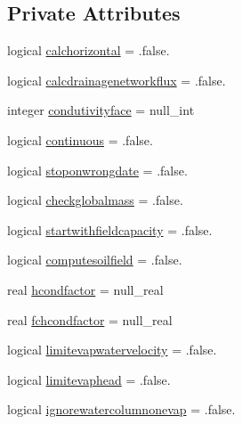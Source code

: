 \subsection*{Private Attributes}
\begin{DoxyCompactItemize}
\item 
logical \mbox{\hyperlink{structmoduleporousmedia_1_1t__soiloptions_aa0343da5c69229092aef8a6022fecd16}{calchorizontal}} = .false.
\item 
logical \mbox{\hyperlink{structmoduleporousmedia_1_1t__soiloptions_ab3c2ac806db1d13354ba04cb2abe049f}{calcdrainagenetworkflux}} = .false.
\item 
integer \mbox{\hyperlink{structmoduleporousmedia_1_1t__soiloptions_ab8d4991a4f4a66f29e309c6317639449}{condutivityface}} = null\+\_\+int
\item 
logical \mbox{\hyperlink{structmoduleporousmedia_1_1t__soiloptions_a7b56e8c8ae667711e0daf3c30b591d27}{continuous}} = .false.
\item 
logical \mbox{\hyperlink{structmoduleporousmedia_1_1t__soiloptions_a6dc4e877999dca7c798b42863714a2ee}{stoponwrongdate}} = .false.
\item 
logical \mbox{\hyperlink{structmoduleporousmedia_1_1t__soiloptions_ae86e4c7b2a514c6719dbc57762595a21}{checkglobalmass}} = .false.
\item 
logical \mbox{\hyperlink{structmoduleporousmedia_1_1t__soiloptions_a9871f788433b21664f0931d48e2155ea}{startwithfieldcapacity}} = .false.
\item 
logical \mbox{\hyperlink{structmoduleporousmedia_1_1t__soiloptions_ac13e34d272292b471e1415409523fc28}{computesoilfield}} = .false.
\item 
real \mbox{\hyperlink{structmoduleporousmedia_1_1t__soiloptions_a6660bb447a7f61d3d680fe48b5030d85}{hcondfactor}} = null\+\_\+real
\item 
real \mbox{\hyperlink{structmoduleporousmedia_1_1t__soiloptions_a7580cdc43976cf6906493f95f867d9ba}{fchcondfactor}} = null\+\_\+real
\item 
logical \mbox{\hyperlink{structmoduleporousmedia_1_1t__soiloptions_ad3f28160c4b73c3dece26376b526c34f}{limitevapwatervelocity}} = .false.
\item 
logical \mbox{\hyperlink{structmoduleporousmedia_1_1t__soiloptions_a82725a0959ce3a4b7da36936f818a8ab}{limitevaphead}} = .false.
\item 
logical \mbox{\hyperlink{structmoduleporousmedia_1_1t__soiloptions_a710a9a6b7e9adcc2fca07fe403fbe59b}{ignorewatercolumnonevap}} = .false.
\item 

\end{DoxyCompactItemize}

